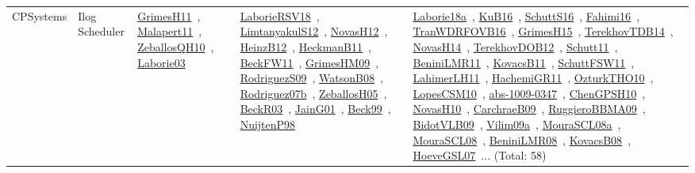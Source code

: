 {\begin{longtable}{lp{3cm}>{\raggedright\arraybackslash}p{6cm}>{\raggedright\arraybackslash}p{6cm}>{\raggedright\arraybackslash}p{8cm}}
CPSystems & Ilog Scheduler & \href{../works/GrimesH11.pdf}{GrimesH11}~\cite{GrimesH11}, \href{../works/Malapert11.pdf}{Malapert11}~\cite{Malapert11}, \href{../works/ZeballosQH10.pdf}{ZeballosQH10}~\cite{ZeballosQH10}, \href{../works/Laborie03.pdf}{Laborie03}~\cite{Laborie03} & \href{../works/LaborieRSV18.pdf}{LaborieRSV18}~\cite{LaborieRSV18}, \href{../works/LimtanyakulS12.pdf}{LimtanyakulS12}~\cite{LimtanyakulS12}, \href{../works/NovasH12.pdf}{NovasH12}~\cite{NovasH12}, \href{../works/HeinzB12.pdf}{HeinzB12}~\cite{HeinzB12}, \href{../works/HeckmanB11.pdf}{HeckmanB11}~\cite{HeckmanB11}, \href{../works/BeckFW11.pdf}{BeckFW11}~\cite{BeckFW11}, \href{../works/GrimesHM09.pdf}{GrimesHM09}~\cite{GrimesHM09}, \href{../works/RodriguezS09.pdf}{RodriguezS09}~\cite{RodriguezS09}, \href{../works/WatsonB08.pdf}{WatsonB08}~\cite{WatsonB08}, \href{../works/Rodriguez07b.pdf}{Rodriguez07b}~\cite{Rodriguez07b}, \href{../works/ZeballosH05.pdf}{ZeballosH05}~\cite{ZeballosH05}, \href{../works/BeckR03.pdf}{BeckR03}~\cite{BeckR03}, \href{../works/JainG01.pdf}{JainG01}~\cite{JainG01}, \href{../works/Beck99.pdf}{Beck99}~\cite{Beck99}, \href{../works/NuijtenP98.pdf}{NuijtenP98}~\cite{NuijtenP98} & \href{../works/Laborie18a.pdf}{Laborie18a}~\cite{Laborie18a}, \href{../works/KuB16.pdf}{KuB16}~\cite{KuB16}, \href{../works/SchuttS16.pdf}{SchuttS16}~\cite{SchuttS16}, \href{../works/Fahimi16.pdf}{Fahimi16}~\cite{Fahimi16}, \href{../works/TranWDRFOVB16.pdf}{TranWDRFOVB16}~\cite{TranWDRFOVB16}, \href{../works/GrimesH15.pdf}{GrimesH15}~\cite{GrimesH15}, \href{../works/TerekhovTDB14.pdf}{TerekhovTDB14}~\cite{TerekhovTDB14}, \href{../works/NovasH14.pdf}{NovasH14}~\cite{NovasH14}, \href{../works/TerekhovDOB12.pdf}{TerekhovDOB12}~\cite{TerekhovDOB12}, \href{../works/Schutt11.pdf}{Schutt11}~\cite{Schutt11}, \href{../works/BeniniLMR11.pdf}{BeniniLMR11}~\cite{BeniniLMR11}, \href{../works/KovacsB11.pdf}{KovacsB11}~\cite{KovacsB11}, \href{../works/SchuttFSW11.pdf}{SchuttFSW11}~\cite{SchuttFSW11}, \href{../works/LahimerLH11.pdf}{LahimerLH11}~\cite{LahimerLH11}, \href{../works/HachemiGR11.pdf}{HachemiGR11}~\cite{HachemiGR11}, \href{../works/OzturkTHO10.pdf}{OzturkTHO10}~\cite{OzturkTHO10}, \href{../works/LopesCSM10.pdf}{LopesCSM10}~\cite{LopesCSM10}, \href{../works/abs-1009-0347.pdf}{abs-1009-0347}~\cite{abs-1009-0347}, \href{../works/ChenGPSH10.pdf}{ChenGPSH10}~\cite{ChenGPSH10}, \href{../works/NovasH10.pdf}{NovasH10}~\cite{NovasH10}, \href{../works/CarchraeB09.pdf}{CarchraeB09}~\cite{CarchraeB09}, \href{../works/RuggieroBBMA09.pdf}{RuggieroBBMA09}~\cite{RuggieroBBMA09}, \href{../works/BidotVLB09.pdf}{BidotVLB09}~\cite{BidotVLB09}, \href{../works/Vilim09a.pdf}{Vilim09a}~\cite{Vilim09a}, \href{../works/MouraSCL08a.pdf}{MouraSCL08a}~\cite{MouraSCL08a}, \href{../works/MouraSCL08.pdf}{MouraSCL08}~\cite{MouraSCL08}, \href{../works/BeniniLMR08.pdf}{BeniniLMR08}~\cite{BeniniLMR08}, \href{../works/KovacsB08.pdf}{KovacsB08}~\cite{KovacsB08}, \href{../works/HoeveGSL07.pdf}{HoeveGSL07}~\cite{HoeveGSL07}... (Total: 58)\\

\end{longtable}}
